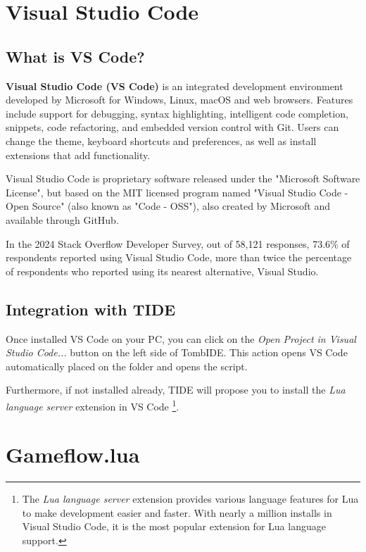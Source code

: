 \section{Visual Studio Code  }

\subsection{What is VS Code?}
\textbf{Visual Studio Code (VS Code)} is an integrated development environment developed by Microsoft for Windows, Linux, macOS and web browsers. Features include support for debugging, syntax highlighting, intelligent code completion, snippets, code refactoring, and embedded version control with Git. Users can change the theme, keyboard shortcuts and preferences, as well as install extensions that add functionality.

\par Visual Studio Code is proprietary software released under the "Microsoft Software License", but based on the MIT licensed program named "Visual Studio Code - Open Source" (also known as "Code - OSS"), also created by Microsoft and available through GitHub.

\par In the 2024 Stack Overflow Developer Survey, out of 58,121 responses, 73.6\% of respondents reported using Visual Studio Code, more than twice the percentage of respondents who reported using its nearest alternative, Visual Studio. \cite{VSCode_Wikipedia}

\subsection{Integration with TIDE}
Once installed VS Code on your PC, you can click on the \emph{Open Project in Visual Studio Code...} button on the left side of TombIDE. This action opens VS Code automatically placed on the  folder and opens the  script.
\par Furthermore, if not installed already, TIDE will propose you to install the \emph{Lua language server} extension in VS Code \footnote{The \emph{Lua language server} extension provides various language features for Lua to make development easier and faster. With nearly a million installs in Visual Studio Code, it is the most popular extension for Lua language support.}.

\section{Gameflow.lua}

